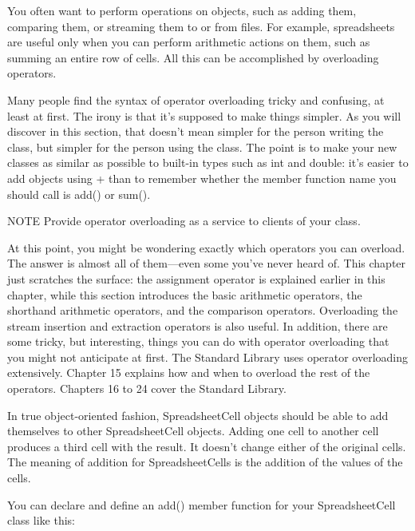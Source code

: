 
You often want to perform operations on objects, such as adding them, comparing them, or streaming them to or from files. For example, spreadsheets are useful only when you can perform arithmetic actions on them, such as summing an entire row of cells. All this can be accomplished by overloading operators.

Many people find the syntax of operator overloading tricky and confusing, at least at first. The irony is that it’s supposed to make things simpler. As you will discover in this section, that doesn’t mean simpler for the person writing the class, but simpler for the person using the class. The point is to make your new classes as similar as possible to built-in types such as int and double: it’s easier to add objects using + than to remember whether the member function name you should call is add() or sum().

\begin{myNotic}{NOTE}
Provide operator overloading as a service to clients of your class.
\end{myNotic}

At this point, you might be wondering exactly which operators you can overload. The answer is almost all of them—even some you’ve never heard of. This chapter just scratches the surface: the assignment operator is explained earlier in this chapter, while this section introduces the basic arithmetic operators, the shorthand arithmetic operators, and the comparison operators. Overloading the stream insertion and extraction operators is also useful. In addition, there are some tricky, but interesting, things you can do with operator overloading that you might not anticipate at first. The Standard Library uses operator overloading extensively. Chapter 15 explains how and when to overload the rest of the operators. Chapters 16 to 24 cover the Standard Library.


In true object-oriented fashion, SpreadsheetCell objects should be able to add themselves to other SpreadsheetCell objects. Adding one cell to another cell produces a third cell with the result. It doesn’t change either of the original cells. The meaning of addition for SpreadsheetCells is the addition of the values of the cells.


You can declare and define an add() member function for your SpreadsheetCell class like this:

